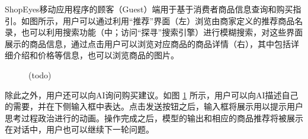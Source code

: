 ShopEyes移动应用程序的顾客（Guest）端用于基于消费者商品信息查询和购买指引。如图所示，用户可以通过利用“推荐”界面（左）浏览由商家定义的推荐商品名录，也可以利用搜索功能（中；访问“探寻”搜索引擎）进行模糊搜索，对这些界面展示的商品信息，通过点击用户可以浏览对应商品的商品详情（右），其中包括详细介绍和价格等信息，也可以浏览商品的图片。

\begin{figure}[htbp]
    \centering
    \hfill
	\caption{(todo)}
	\label{fig:seg-assist}
\end{figure}

除此之外，用户还可以向AI询问购买建议。如图 \ref{fig:seg-assist} 所示，用户可以向AI描述自己的需要，并在下侧输入框中表达。点击发送按钮之后，输入框将展示用以提示用户思考过程政治进行的动画。操作完成之后，模型的输出和相应的商品推荐将被展示在对话中，用户也可以继续下一轮问题。

